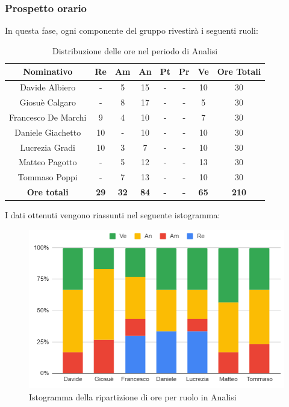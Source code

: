 \subsubsection{Prospetto orario}
In questa fase, ogni componente del gruppo rivestirà i seguenti ruoli:
\begin{table}[H]
		\begin{center}
			\setlength{\aboverulesep}{0pt}
			\setlength{\belowrulesep}{0pt}
			\setlength{\extrarowheight}{.75ex}
			\begin{tabular}{ c c c c c c c c }
				\rowcolor{AzzurroGruppo!30} 
				\textbf{Nominativo} & \textbf{Re} & \textbf{Am} & \textbf{An} & \textbf{Pt} & \textbf{Pr} & \textbf{Ve} & \textbf{Ore Totali}  \\
				\toprule
				Davide Albiero      & -  & 5  & 15 & - & - & 10 & 30 \\
				Giosuè Calgaro      & -  & 8  & 17 & - & - & 5  & 30 \\
				Francesco De Marchi & 9  & 4  & 10 & - & - & 7  & 30\\
				Daniele Giachetto   & 10 & -  & 10 & - & - & 10 & 30\\
				Lucrezia Gradi      & 10  & 3 & 7 & - & - & 10 & 30\\
				Matteo Pagotto      & -  & 5  & 12 & - & - & 13 & 30\\
				Tommaso Poppi       & -  & 7  & 13 & - & - & 10  & 30\\
				 \textbf{Ore totali} & \textbf{29} & \textbf{32} & \textbf{84} & \textbf{-} & \textbf{-} & \textbf{65} & \textbf{210} \\
				\bottomrule
			\end{tabular}
			\caption{Distribuzione delle ore nel periodo di Analisi}
		\end{center}
	\end{table}
I dati ottenuti vengono riassunti nel seguente istogramma:
\begin{figure}[H]
    \centering
    \includegraphics[scale = 0.5]{components/img/Analisi_isto.png}
    \caption{ Istogramma della ripartizione di ore per ruolo in Analisi}
    \label{fig:istogramma ripartizione ore , fase di Analisi}
\end{figure}
